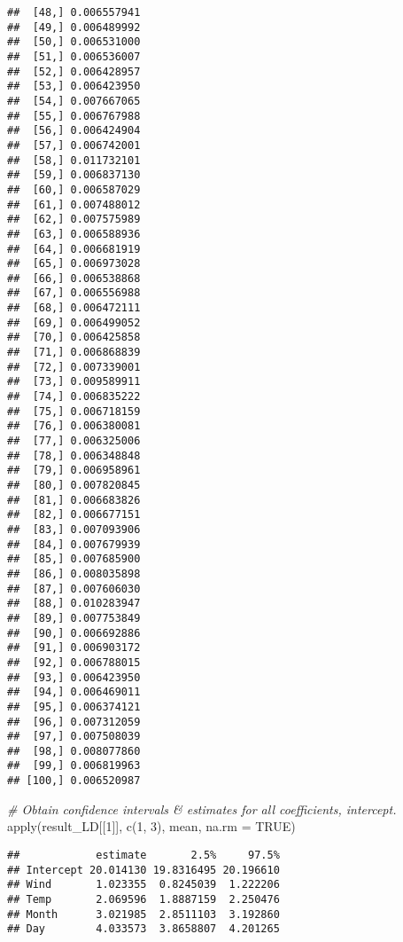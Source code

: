 \documentclass[
]{article}
\newenvironment{Shaded}{\begin{snugshade}}{\end{snugshade}}
\newcommand{\AttributeTok}[1]{\textcolor[rgb]{0.77,0.63,0.00}{#1}}
\newcommand{\CommentTok}[1]{\textcolor[rgb]{0.56,0.35,0.01}{\textit{#1}}}
\newcommand{\ConstantTok}[1]{\textcolor[rgb]{0.00,0.00,0.00}{#1}}
\newcommand{\DecValTok}[1]{\textcolor[rgb]{0.00,0.00,0.81}{#1}}
\newcommand{\FunctionTok}[1]{\textcolor[rgb]{0.00,0.00,0.00}{#1}}
\newcommand{\NormalTok}[1]{#1}
\begin{document}
\begin{verbatim}
##  [48,] 0.006557941
##  [49,] 0.006489992
##  [50,] 0.006531000
##  [51,] 0.006536007
##  [52,] 0.006428957
##  [53,] 0.006423950
##  [54,] 0.007667065
##  [55,] 0.006767988
##  [56,] 0.006424904
##  [57,] 0.006742001
##  [58,] 0.011732101
##  [59,] 0.006837130
##  [60,] 0.006587029
##  [61,] 0.007488012
##  [62,] 0.007575989
##  [63,] 0.006588936
##  [64,] 0.006681919
##  [65,] 0.006973028
##  [66,] 0.006538868
##  [67,] 0.006556988
##  [68,] 0.006472111
##  [69,] 0.006499052
##  [70,] 0.006425858
##  [71,] 0.006868839
##  [72,] 0.007339001
##  [73,] 0.009589911
##  [74,] 0.006835222
##  [75,] 0.006718159
##  [76,] 0.006380081
##  [77,] 0.006325006
##  [78,] 0.006348848
##  [79,] 0.006958961
##  [80,] 0.007820845
##  [81,] 0.006683826
##  [82,] 0.006677151
##  [83,] 0.007093906
##  [84,] 0.007679939
##  [85,] 0.007685900
##  [86,] 0.008035898
##  [87,] 0.007606030
##  [88,] 0.010283947
##  [89,] 0.007753849
##  [90,] 0.006692886
##  [91,] 0.006903172
##  [92,] 0.006788015
##  [93,] 0.006423950
##  [94,] 0.006469011
##  [95,] 0.006374121
##  [96,] 0.007312059
##  [97,] 0.007508039
##  [98,] 0.008077860
##  [99,] 0.006819963
## [100,] 0.006520987
\end{verbatim}

\begin{Shaded}
\begin{Highlighting}[]
\CommentTok{\# Obtain confidence intervals \& estimates for all coefficients, intercept.}
\FunctionTok{apply}\NormalTok{(result\_LD[[}\DecValTok{1}\NormalTok{]], }\FunctionTok{c}\NormalTok{(}\DecValTok{1}\NormalTok{, }\DecValTok{3}\NormalTok{), mean, }\AttributeTok{na.rm =} \ConstantTok{TRUE}\NormalTok{)}
\end{Highlighting}
\end{Shaded}

\begin{verbatim}
##            estimate       2.5%     97.5%
## Intercept 20.014130 19.8316495 20.196610
## Wind       1.023355  0.8245039  1.222206
## Temp       2.069596  1.8887159  2.250476
## Month      3.021985  2.8511103  3.192860
## Day        4.033573  3.8658807  4.201265
\end{verbatim}
\end{document}
